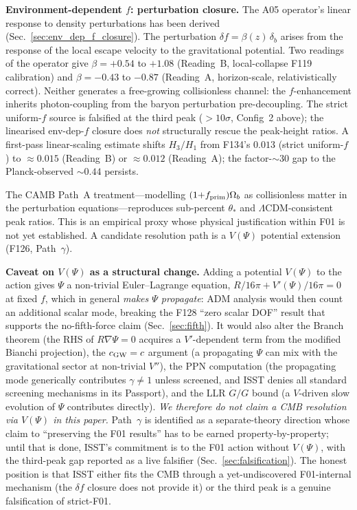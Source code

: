 \documentclass[aps,prd,twocolumn,nofootinbib,floatfix,superscriptaddress]{revtex4-2}
\newcommand{\fprim}{f_{\rm prim}}
\begin{document}
\textbf{Environment-dependent $f$: perturbation closure.}
The A05 operator's linear response to density perturbations has
been derived (Sec.~\ref{sec:env_dep_f_closure}). The perturbation
$\delta f = \beta(z)\,\delta_b$ arises from the response of the
local escape velocity to the gravitational potential. Two readings
of the operator give $\beta = +0.54$ to $+1.08$ (Reading~B,
local-collapse F119 calibration) and $\beta = -0.43$ to $-0.87$
(Reading~A, horizon-scale, relativistically correct). Neither
generates a free-growing collisionless channel: the $f$-enhancement
inherits photon-coupling from the baryon perturbation pre-decoupling.
The strict uniform-$f$ source is falsified at the third peak
($>10\sigma$, Config~2 above); the linearised env-dep-$f$ closure
does \emph{not} structurally rescue the peak-height ratios. A
first-pass linear-scaling estimate shifts $H_3/H_1$ from
F134's $0.013$ (strict uniform-$f$) to $\approx 0.015$ (Reading~B)
or $\approx 0.012$ (Reading~A); the factor-$\sim 30$ gap to the
Planck-observed $\sim 0.44$ persists.

The CAMB Path~A treatment---modelling $(1{+}\fprim)\Omega_b$ as
collisionless matter in the perturbation equations---reproduces
sub-percent $\theta_*$ and $\Lambda$CDM-consistent peak ratios.
This is an empirical proxy whose physical justification within F01
is not yet established. A candidate resolution path is a $V(\Psi)$
potential extension (F126, Path~$\gamma$).

\textbf{Caveat on $V(\Psi)$ as a structural change.}
Adding a potential $V(\Psi)$ to the action gives $\Psi$ a
non-trivial Euler--Lagrange equation,
$R/16\pi + V'(\Psi)/16\pi = 0$ at fixed $f$, which in general
\emph{makes $\Psi$ propagate}: ADM analysis would then count an
additional scalar mode, breaking the F128 ``zero scalar DOF''
result that supports the no-fifth-force claim
(Sec.~\ref{sec:fifth}). It would also alter the Branch theorem (the
RHS of $R\nabla\Psi = 0$ acquires a $V'$-dependent term from the
modified Bianchi projection), the $c_{\rm GW} = c$ argument (a
propagating $\Psi$ can mix with the gravitational sector at
non-trivial $V''$), the PPN computation (the propagating mode
generically contributes $\gamma \neq 1$ unless screened, and ISST
denies all standard screening mechanisms in its Passport), and the
LLR $\dot G/G$ bound (a $V$-driven slow evolution of $\Psi$
contributes directly). \emph{We therefore do not claim a CMB
resolution via $V(\Psi)$ in this paper.} Path~$\gamma$ is identified
as a separate-theory direction whose claim to ``preserving the F01
results'' has to be earned property-by-property; until that is
done, ISST's commitment is to the F01 action without $V(\Psi)$,
with the third-peak gap reported as a live falsifier
(Sec.~\ref{sec:falsification}). The honest position is that ISST
either fits the CMB through a yet-undiscovered F01-internal
mechanism (the $\delta f$ closure does not provide it) or the third
peak is a genuine falsification of strict-F01.
\end{document}
